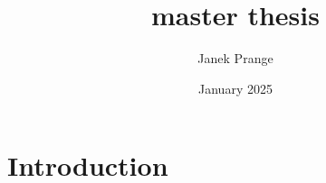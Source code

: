 \documentclass{article}
\title{master thesis}
\author{Janek Prange}
\date{January 2025}
\begin{document}
\maketitle

\section{Introduction}
\end{document}
